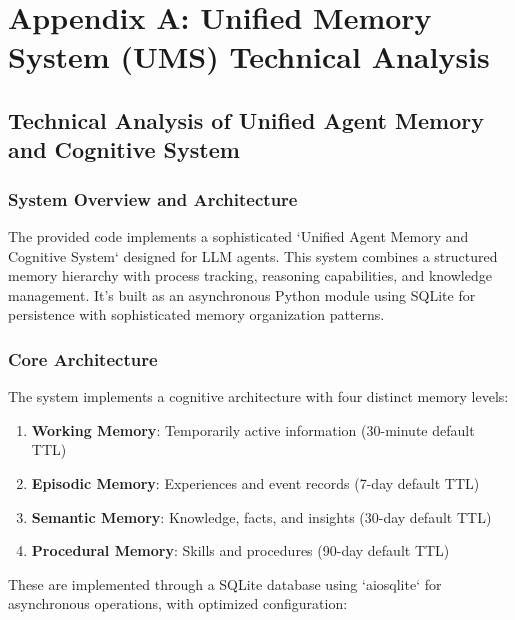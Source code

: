 \documentclass[12pt,a4paper]{article}
\begin{document}
\appendix
\section{Appendix A: Unified Memory System (UMS) Technical Analysis}


\subsection*{Technical Analysis of Unified Agent Memory and Cognitive System}

\subsubsection*{System Overview and Architecture}

The provided code implements a sophisticated `Unified Agent Memory and Cognitive System` designed for LLM agents. This system combines a structured memory hierarchy with process tracking, reasoning capabilities, and knowledge management. It's built as an asynchronous Python module using SQLite for persistence with sophisticated memory organization patterns.

\subsubsection*{Core Architecture}

The system implements a cognitive architecture with four distinct memory levels:

\begin{enumerate}[label=\arabic*.]
    \item \textbf{Working Memory}: Temporarily active information (30-minute default TTL)
    \item \textbf{Episodic Memory}: Experiences and event records (7-day default TTL)
    \item \textbf{Semantic Memory}: Knowledge, facts, and insights (30-day default TTL)
    \item \textbf{Procedural Memory}: Skills and procedures (90-day default TTL)
\end{enumerate}

These are implemented through a SQLite database using `aiosqlite` for asynchronous operations, with optimized configuration:
\end{document}
